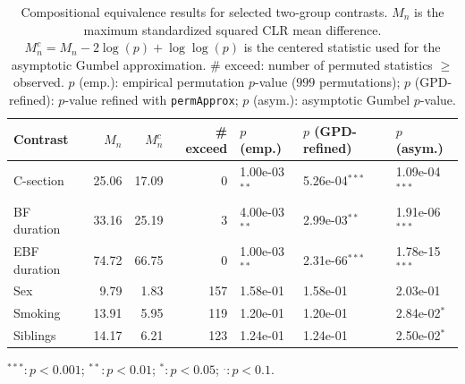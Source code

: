 \begin{table}[!h]
\centering
\caption{\label{tab:application:comp-equivalence}Compositional equivalence results for selected two-group contrasts. $M_n$ is the maximum standardized squared CLR mean difference. $M_n^c = M_n - 2\log(p) + \log\log(p)$ is the centered statistic used for the asymptotic Gumbel approximation. \# exceed: number of permuted statistics $\geq$ observed. $p$ (emp.): empirical permutation $p$-value ($999$ permutations); $p$ (GPD-refined): $p$-value refined with \texttt{permApprox}; $p$ (asym.): asymptotic Gumbel $p$-value.}
\centering
\begin{threeparttable}
\begin{tabular}[t]{lrrrlll}
\toprule
Contrast & $M_n$ & $M_n^c$ & \# exceed & $p$ (emp.) & $p$ (GPD-refined) & $p$ (asym.)\\
\midrule
C-section & 25.06 & 17.09 & 0 & 1.00e-03$^{**}$ & 5.26e-04$^{***}$ & 1.09e-04$^{***}$\\
BF duration & 33.16 & 25.19 & 3 & 4.00e-03$^{**}$ & 2.99e-03$^{**}$ & 1.91e-06$^{***}$\\
EBF duration & 74.72 & 66.75 & 0 & 1.00e-03$^{**}$ & 2.31e-66$^{***}$ & 1.78e-15$^{***}$\\
Sex & 9.79 & 1.83 & 157 & 1.58e-01 & 1.58e-01 & 2.03e-01\\
Smoking & 13.91 & 5.95 & 119 & 1.20e-01 & 1.20e-01 & 2.84e-02$^{*}$\\
\addlinespace
Siblings & 14.17 & 6.21 & 123 & 1.24e-01 & 1.24e-01 & 2.50e-02$^{*}$\\
\bottomrule
\end{tabular}
\begin{tablenotes}
\item $^{***}:p<0.001$; $^{**}:p<0.01$; $^{*}:p<0.05$; $^{.}:p<0.1$.
\end{tablenotes}
\end{threeparttable}
\end{table}
